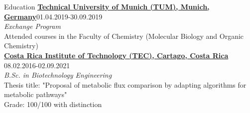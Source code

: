 \begin{rSection}{Education}
	{\bf \href{https://www.tum.de/en/}{Technical University of Munich (TUM), Munich, Germany}}\hfill {01.04.2019-30.09.2019}\\
	\textit{Exchange Program}\\
	Attended courses in the Faculty of Chemistry (Molecular Biology and Organic Chemistry)\\

	{\bf \href{https://www.tec.ac.cr/}{Costa Rica Institute of Technology (TEC), Cartago, Costa Rica}} \hfill {08.02.2016-02.09.2021} \\
	\textit{B.Sc. in Biotechnology Engineering}\\
	Thesis title: "Proposal of metabolic flux comparison by adapting algorithms for metabolic pathways"\\
	Grade: 100/100 with distinction


\end{rSection}

